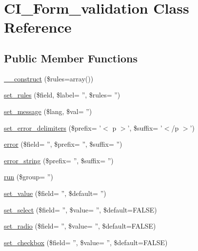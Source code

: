 \hypertarget{class_c_i___form__validation}{\section{C\-I\-\_\-\-Form\-\_\-validation Class Reference}
\label{class_c_i___form__validation}
}
\subsection*{Public Member Functions}
\begin{DoxyCompactItemize}
\item 
\hyperlink{class_c_i___form__validation_ac7224a1f92da249b312d1400c459ba83}{\-\_\-\-\_\-construct} (\$rules=array())
\item 
\hyperlink{class_c_i___form__validation_ae9436b60fedfb89ec1888b355e3ef3a6}{set\-\_\-rules} (\$field, \$label= '', \$rules= '')
\item 
\hyperlink{class_c_i___form__validation_a09634765920fbb178a76fcf9690e0e86}{set\-\_\-message} (\$lang, \$val= '')
\item 
\hyperlink{class_c_i___form__validation_af8f2dc3325362faef29ccf64b7f3fb27}{set\-\_\-error\-\_\-delimiters} (\$prefix= '$<$ p $>$', \$suffix= '$<$/p $>$')
\item 
\hyperlink{class_c_i___form__validation_acf78c6bd8181779486407f1c4ef12c30}{error} (\$field= '', \$prefix= '', \$suffix= '')
\item 
\hyperlink{class_c_i___form__validation_a583ab6b5d353cca33fdd076c364dbdf3}{error\-\_\-string} (\$prefix= '', \$suffix= '')
\item 
\hyperlink{class_c_i___form__validation_adf7a41dbb03750328e510ad6c703c085}{run} (\$group= '')
\item 
\hyperlink{class_c_i___form__validation_aaa70eb02beedeae55d7cfb37462f23a5}{set\-\_\-value} (\$field= '', \$default= '')
\item 
\hyperlink{class_c_i___form__validation_ac404077526153c2c3330cb00e47affd7}{set\-\_\-select} (\$field= '', \$value= '', \$default=F\-A\-L\-S\-E)
\item 
\hyperlink{class_c_i___form__validation_a3f76b822a246401c16949c8066dfea3c}{set\-\_\-radio} (\$field= '', \$value= '', \$default=F\-A\-L\-S\-E)
\item 
\hyperlink{class_c_i___form__validation_a1fe43ad49fc07563737e50922c90492b}{set\-\_\-checkbox} (\$field= '', \$value= '', \$default=F\-A\-L\-S\-E)
\item 

\end{DoxyCompactItemize}
